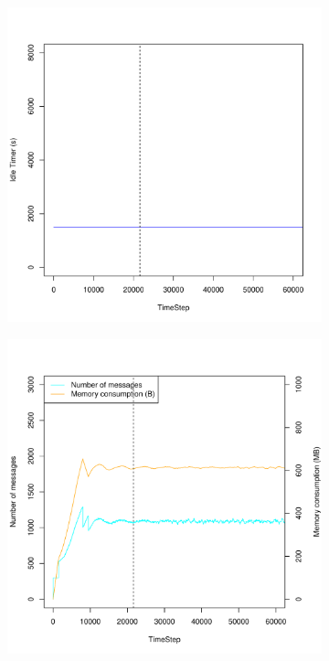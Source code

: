 \documentclass[a4j]{ujarticle}
\begin{document}
\begin{figure}[htbp]
\begin{subfigure}{0.49\hsize}
   \includegraphics[width=1.0\hsize]{scenario_6_idleTimer_0_86400.pdf}
   \label{subfig:scenario_6_idleTimer_0_86400}
 \end{subfigure}
 \par\bigskip %
 \begin{subfigure}{0.49\hsize}
   \centering
   \includegraphics[width=1.0\hsize]{scenario_6_signaling_and_memoryload_vs_timeStep_0_86400.pdf}

\end{subfigure}
\end{figure}
\end{document}
